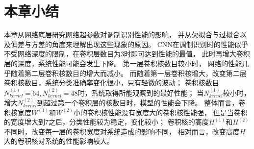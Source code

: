%
%
%
%
%
%
%
%

\section{本章小结}

本章从网络底层研究网络超参数对调制识别性能的影响，
并从欠拟合与过拟合以及偏差与方差的角度来理解出现这些现象的原因。
CNN在调制识别时的性能似乎不受网络深度的限制，在卷积层数目为$3$时即可达到性能的最值，
此时再增大卷积层的深度，系统性能可能会发生下降。
第一层卷积核数目较小时，
网络的性能几乎随着第二层卷积核数目的增大而减小。
而随着第一层卷积核增大，改变第二层卷积核数目，系统分类准确率变化很小，只有轻微的波动；
卷积核数目$N_{kernel}^{(1)} =64, N_{kernel}^{(2)} =48$时，系统取得所能观察到的最好性能；
当$N_{kernel}^{(1)}$较小时，增大$N_{kernel}^{(2)}$到超过第一个卷积层的核数目时，模型的性能会下降。
整体而言，卷积核宽度$W^{(1)}$和$W^{(2)}$小的卷积核性能没有宽度大的卷积核性能强，
但是当卷积的宽度增大到$7$之后，分类性能较为稳定，变化较小；
卷积核的高度$H^{(1)}$和$H^{(2)}$不同时，改变每一层的卷积宽度对系统造成的影响不同，
相对而言，改变高度$H$大的卷积核对系统的性能影响较大。\par
